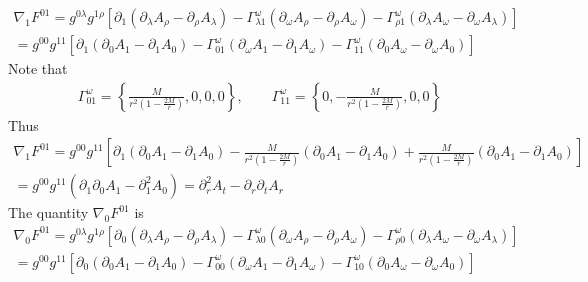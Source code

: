 \documentclass[12pt]{article}
\def\nn{\nonumber}
\begin{document}
\begin{gather}
\nabla_{1}F^{01}
=
g^{0 \lambda} g^{1 \rho}
\left[
\partial_{1} 
(\partial_{\lambda}A_{\rho}
-
\partial_{\rho}A_{\lambda})
-
\Gamma_{\lambda 1}^{\omega} 
(\partial_{\omega} A_{\rho}
-
\partial_{\rho} A_{\omega})
-
\Gamma_{\rho 1}^{\omega}
(\partial_{\lambda} A_{\omega}
-
\partial_{\omega} A_{\lambda})
\right]
\nn \\
=
g^{00} g^{11}
\left[
\partial_{1} 
(\partial_{0}A_{1}
-
\partial_{1}A_{0})
-
\Gamma_{01}^{\omega} 
(\partial_{\omega} A_{1}
-
\partial_{1} A_{\omega})
-
\Gamma_{11}^{\omega}
(\partial_{0} A_{\omega}
-
\partial_{\omega} A_{0})
\right]
\end{gather}
Note that
\begin{gather}
\Gamma^{\omega}_{01}
=
\left\{
\frac{M}{r^{2} (1 - \frac{2 M}{r})}
,0,0,0
\right\}
,
\qquad
\Gamma^{\omega}_{11}
=
\left\{
0,-\frac{M}{r^{2} (1 - \frac{2 M}{r})},0,0
\right\}
\end{gather}
Thus
\begin{gather}
\nabla_{1}F^{01}
=
g^{00} g^{11}
\left[
\partial_{1} 
(\partial_{0}A_{1}
-
\partial_{1}A_{0})
-
\frac{M}{r^{2} (1 - \frac{2 M}{r})}
(\partial_{0} A_{1}
-
\partial_{1} A_{0})
+
\frac{M}{r^{2} (1 - \frac{2 M}{r})}
(\partial_{0} A_{1}
-
\partial_{1} A_{0})
\right]
\nn \\
=
g^{00} g^{11}
(
\partial_{1} 
\partial_{0}A_{1}
-
\partial_{1}^{2}A_{0})
=
\partial_{r}^{2}A_{t}
-
\partial_{r} 
\partial_{t}A_{r}
\end{gather}
The quantity $\nabla_{0} F^{01}$ is
\begin{gather}
\nabla_{0}F^{01}
=
g^{0\lambda} g^{1\rho}
\left[
\partial_{0} 
(\partial_{\lambda}A_{\rho}
-
\partial_{\rho}A_{\lambda})
-
\Gamma_{\lambda 0}^{\omega} 
(\partial_{\omega} A_{\rho}
-
\partial_{\rho} A_{\omega})
-
\Gamma_{\rho 0}^{\omega}
(\partial_{\lambda} A_{\omega}
-
\partial_{\omega} A_{\lambda})
\right]
\nn \\
=
g^{00} g^{11}
\left[
\partial_{0} 
(\partial_{0}A_{1}
-
\partial_{1}A_{0})
-
\Gamma_{00}^{\omega} 
(\partial_{\omega} A_{1}
-
\partial_{1} A_{\omega})
-
\Gamma_{10}^{\omega}
(\partial_{0} A_{\omega}
-
\partial_{\omega} A_{0})
\right]
\end{gather}
\end{document}
